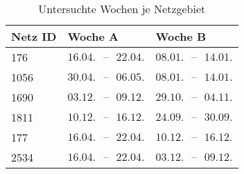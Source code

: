 {
\renewcommand{\arraystretch}{1.2}%
\begin{table}[H]
	\begin{center}
		\caption{Untersuchte Wochen je Netzgebiet}
		\begin{tabu} to 0.6\textwidth {X[0.5] X[1, r] X[1, r]}
			\toprule
			Netz ID	   & Woche A                         & Woche B                         \\ \midrule
			\num{176}  & \(16.04. \text{ {--} } 22.04.\) & \(08.01. \text{ {--} } 14.01.\) \\
			\num{1056} & \(30.04. \text{ {--} } 06.05.\) & \(08.01. \text{ {--} } 14.01.\) \\
			\num{1690} & \(03.12. \text{ {--} } 09.12.\) & \(29.10. \text{ {--} } 04.11.\) \\
			\num{1811} & \(10.12. \text{ {--} } 16.12.\) & \(24.09. \text{ {--} } 30.09.\) \\
			\num{177}  & \(16.04. \text{ {--} } 22.04.\) & \(10.12. \text{ {--} } 16.12.\) \\
			\num{2534} & \(16.04. \text{ {--} } 22.04.\) & \(03.12. \text{ {--} } 09.12.\) \\ \bottomrule
		\end{tabu}
		\label{tab:extreme_weeks}
	\end{center}
	\vspace{-3mm}%
\end{table}
}